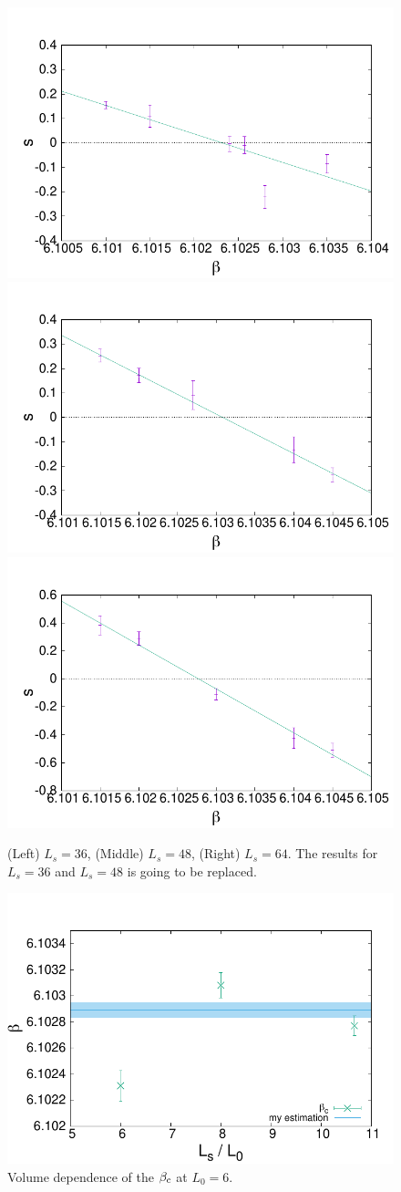 \documentclass{article}
\begin{document}
\begin{figure}[h]
    \centering
    \includegraphics[width=0.3\hsize]{figures/L0_6/plot_s_4pol_Ls_36.pdf}
    \includegraphics[width=0.3\hsize]{figures/L0_6/plot_s_4pol_Ls_48.pdf}
    \includegraphics[width=0.3\hsize]{figures/L0_6/plot_s_4pol_Ls_64.pdf}
    \caption{(Left) $L_s=36$, (Middle) $L_s=48$, (Right) $L_s=64$. The results for $L_s=36$ and $L_s=48$ is going to be replaced.}
    \label{fig:L0_6_beta_c}
\end{figure}

\begin{figure}[h]
    \centering
    \includegraphics[width=0.5\hsize]{figures/L0_6/vol_dep.pdf}
    \caption{Volume dependence of the $\beta_{\rm c}$ at $L_0 = 6$.}
    \label{fig:L0_6_beta_c_vol}
\end{figure}
\end{document}
